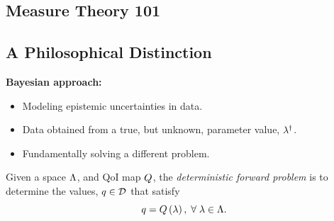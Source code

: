 \subsection{Measure Theory 101}



\subsection{A Philosophical Distinction}

\begin{frame}[t]

{\bf Bayesian approach:}

\medskip
\begin{itemize}
	\item Modeling epistemic uncertainties in data.

	\bigskip
	\item Data obtained from a true, but unknown, parameter value, $\lambda^\dagger$.

	\bigskip
	\item Fundamentally solving a different problem.
\end{itemize}

\bigskip
\begin{defn}
  Given a space ${\Lambda}$, and QoI map $Q$, the \emph{deterministic forward problem} is to determine the values, $q \in \mathcal{D}$ that satisfy
  \begin{equation}
    q = Q\left ( \lambda \right ), \; \forall \; \lambda \in {\Lambda}.
  \end{equation}
\end{defn}


\end{frame}


